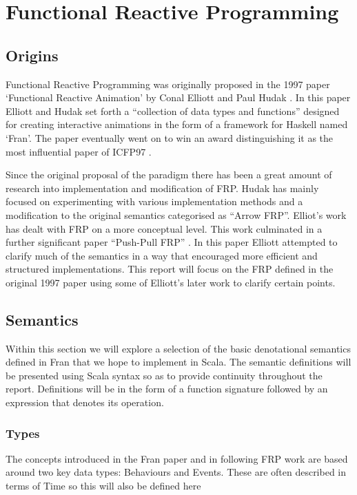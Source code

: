 \chapter{Functional Reactive Programming}
  \section{Origins}
  \label{sec:origins}
    Functional Reactive Programming was originally proposed in the 1997 paper `Functional
    Reactive Animation' by Conal Elliott and Paul Hudak \cite{Elliott1997}. In this paper Elliott and Hudak
    set forth a ``collection of data types and functions'' designed for creating interactive 
    animations in the form of a framework for Haskell named `Fran'. The paper eventually went on to
    win an award distinguishing it as the most influential paper of ICFP97 \cite{SIGPLAN}. 
    
    Since the original proposal of the paradigm there has been a great amount of research
    into implementation and modification of FRP. Hudak has mainly focused on experimenting with various
    implementation methods and a modification to the original semantics categorised as ``Arrow FRP''. Elliot's
    work has dealt with FRP on a more conceptual level. This work culminated in a further significant paper
    ``Push-Pull FRP'' \cite{Elliott2009}. In this paper Elliott attempted to clarify much of the semantics in a way that encouraged more efficient 
    and
    structured implementations. This report will focus on the FRP defined in the original 1997 paper using
    some of Elliott's later work to clarify certain points.

  \section{Semantics}
    \label{sec:semantics}
    Within this section we will explore a selection of the basic denotational semantics defined in Fran
    that we hope to implement in Scala. The semantic definitions will
    be presented using Scala syntax so as to provide continuity throughout the report. Definitions will
    be in the form of a function signature followed by an expression that denotes its operation.
  
    \subsection{Types}
      The concepts introduced in the Fran paper and in following FRP work are based around two key data types: 
      Behaviours and Events. These are often described in terms of Time so this will also be defined here
      

